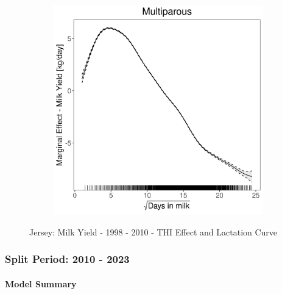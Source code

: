 \begin{figure}[H]
\begin{subfigure}[b]{0.45\textwidth}
    \end{subfigure}
    \hspace{0.05\textwidth} %
    \begin{subfigure}[b]{0.45\textwidth}
        \centering
        \includegraphics[width=\textwidth]{thesis/figures/models/milk/before2010/je_milk_before2010/je_milk_before2010_marginal_dim_milk_multi.png}
    \end{subfigure}
    \caption[]{Jersey: Milk Yield - 1998 - 2010 - THI Effect and Lactation Curve}
    \label{fig:main}
\end{figure}

\subsubsection{Split Period: 2010 - 2023}\label{model:je_milk_after}

\paragraph{Model Summary} \quad \\


